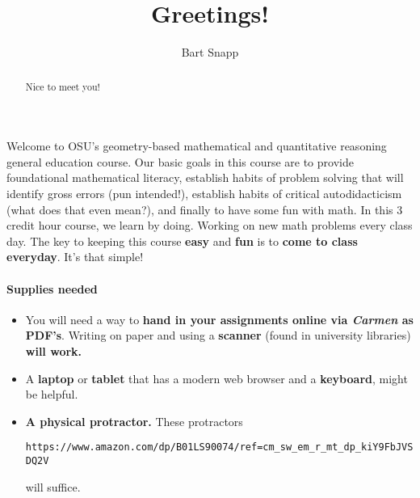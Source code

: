 \documentclass{ximera}
\author{Bart Snapp}
\title{Greetings!}
\begin{document}
    \begin{abstract}
        Nice to meet you!
    \end{abstract}
    \maketitle


Welcome to OSU's geometry-based mathematical and quantitative reasoning general
education course. Our basic goals in this course are to provide foundational
mathematical
literacy, establish habits of problem solving that will identify gross
errors (pun intended!), establish habits of critical autodidacticism
(what does that even mean?), and finally to have some fun with math. In this 3
credit hour course, we learn by doing. Working on new math problems every class
day. The key to keeping this course \textbf{easy} and \textbf{fun} is to
\textbf{come to class everyday}. It's that simple!


\paragraph{Supplies needed}
\begin{itemize}
  \item You will need a way to \textbf{hand in your assignments online via
          \textit{Carmen} as PDF's}. Writing on paper and using a
        \textbf{scanner}
        (found in university libraries) \textbf{will work.}
  \item A \textbf{laptop} or \textbf{tablet} that has a modern web
        browser and a \textbf{keyboard}, might be helpful.
  \item \textbf{A physical protractor.} These protractors
        \begin{center}\small

          \texttt{https://www.amazon.com/dp/B01LS90074/ref=cm\_sw\_em\_r\_mt\_dp\_kiY9FbJVSDQ2V}
        \end{center}
        will suffice.
\end{itemize}
\end{document}
